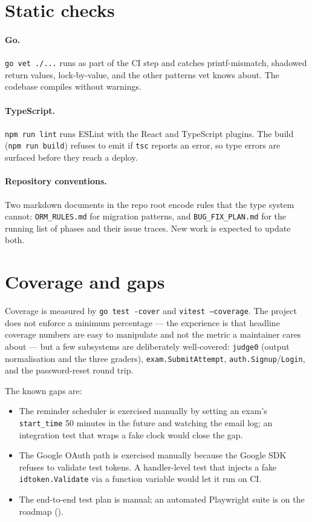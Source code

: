 \section{Static checks}

\paragraph{Go.} \texttt{go vet ./...} runs as part of the CI step and catches printf-mismatch, shadowed return values, lock-by-value, and the other patterns vet knows about. The codebase compiles without warnings.

\paragraph{TypeScript.} \texttt{npm run lint} runs ESLint with the React and TypeScript plugins. The build (\texttt{npm run build}) refuses to emit if \texttt{tsc} reports an error, so type errors are surfaced before they reach a deploy.

\paragraph{Repository conventions.} Two markdown documents in the repo root encode rules that the type system cannot: \texttt{ORM\_RULES.md} for migration patterns, and \texttt{BUG\_FIX\_PLAN.md} for the running list of phases and their issue traces. New work is expected to update both.

\section{Coverage and gaps}

Coverage is measured by \texttt{go test -cover} and \texttt{vitest --coverage}. The project does not enforce a minimum percentage --- the experience is that headline coverage numbers are easy to manipulate and not the metric a maintainer cares about --- but a few subsystems are deliberately well-covered: \texttt{judge0} (output normalisation and the three graders), \texttt{exam.SubmitAttempt}, \texttt{auth.Signup}/\texttt{Login}, and the password-reset round trip.

The known gaps are:

\begin{itemize}
  \item The reminder scheduler is exercised manually by setting an exam's \texttt{start\_time} 50 minutes in the future and watching the email log; an integration test that wraps a fake clock would close the gap.
  \item The Google OAuth path is exercised manually because the Google SDK refuses to validate test tokens. A handler-level test that injects a fake \texttt{idtoken.Validate} via a function variable would let it run on CI.
  \item The end-to-end test plan is manual; an automated Playwright suite is on the roadmap ().
\end{itemize}

